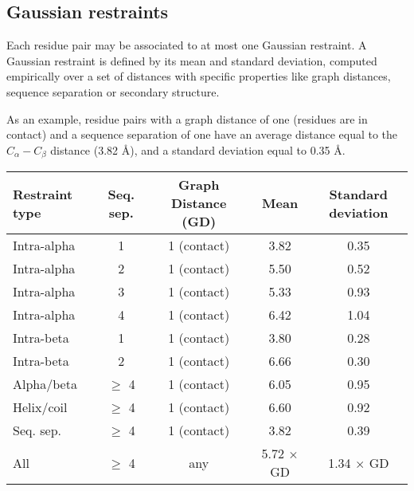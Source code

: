     \subsection{Gaussian restraints}

        Each residue pair may be associated to at most one Gaussian restraint.
        A Gaussian restraint is defined by its mean and standard deviation,
        computed empirically over a set of distances with specific properties
        like graph distances, sequence separation or secondary structure.

        As an example, residue pairs with a graph distance of one (residues are
        in contact) and a sequence separation of one have an average distance equal
        to the $C_{\alpha}-C_{\beta}$ distance (3.82 \AA{}), and a standard deviation
        equal to 0.35 \AA{}.

        \begin{table}[H]
            \centering
            \begin{tabular}{|l|c|c|c|c|}
                \hline
                Restraint type & Seq. sep. & Graph Distance (GD) & Mean & Standard deviation \\
                \hline
                \hline
                Intra-alpha & 1 & 1 (contact) & 3.82 & 0.35 \\
                Intra-alpha & 2 & 1 (contact) & 5.50 & 0.52 \\
                Intra-alpha & 3 & 1 (contact) & 5.33 & 0.93 \\
                Intra-alpha & 4 & 1 (contact) & 6.42 & 1.04 \\
                Intra-beta  & 1 & 1 (contact) & 3.80 & 0.28 \\
                Intra-beta  & 2 & 1 (contact) & 6.66 & 0.30 \\
                Alpha/beta  & $\ge$ 4 & 1 (contact) & 6.05 & 0.95 \\
                Helix/coil  & $\ge$ 4 & 1 (contact) & 6.60 & 0.92 \\
                Seq. sep.   & $\ge$ 4 & 1 (contact) & 3.82 & 0.39 \\
                All & $\ge$ 4 & any & 5.72 $\times$ GD & 1.34 $\times$ GD \\
                \hline
            \end{tabular}
            \label{restraints}
        \end{table}

